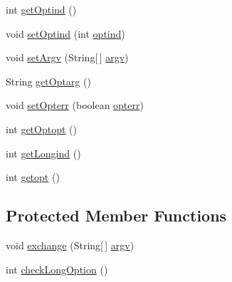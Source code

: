 \begin{DoxyCompactItemize}
int \hyperlink{classgnu_1_1getopt_1_1_getopt_af9f1a42a320e2112325fd5ea41504bdf}{getOptind} ()
\item 
void \hyperlink{classgnu_1_1getopt_1_1_getopt_a876a62ef42014ff4b18be4b132eb7ed8}{setOptind} (int \hyperlink{classgnu_1_1getopt_1_1_getopt_ae80c10d8bfc957fd93bec2f3619cbf18}{optind})
\item 
void \hyperlink{classgnu_1_1getopt_1_1_getopt_a9ac59fc870b6efdafee66014924cf12a}{setArgv} (String\mbox{[}$\,$\mbox{]} \hyperlink{classgnu_1_1getopt_1_1_getopt_adde2117f0df42f3254b37b05fd9833cf}{argv})
\item 
String \hyperlink{classgnu_1_1getopt_1_1_getopt_a306e1acd3be41f5e9462f42e78a6ca93}{getOptarg} ()
\item 
void \hyperlink{classgnu_1_1getopt_1_1_getopt_aa132089015be3665ca422f3eae3d0a38}{setOpterr} (boolean \hyperlink{classgnu_1_1getopt_1_1_getopt_a8712d370a08f90b7b49b0261a2df8581}{opterr})
\item 
int \hyperlink{classgnu_1_1getopt_1_1_getopt_ad33843ab06130ce60d60556241d1dc99}{getOptopt} ()
\item 
int \hyperlink{classgnu_1_1getopt_1_1_getopt_abaf4fb9de230e1950d93abc1b9f86a8d}{getLongind} ()
\item 
int \hyperlink{classgnu_1_1getopt_1_1_getopt_a49e6fc6e18756f5dfaf85c1067325c3b}{getopt} ()
\end{DoxyCompactItemize}
\subsection*{Protected Member Functions}
\begin{DoxyCompactItemize}
\item 
void \hyperlink{classgnu_1_1getopt_1_1_getopt_aaa3d697613ad3eacc714b9857dc52570}{exchange} (String\mbox{[}$\,$\mbox{]} \hyperlink{classgnu_1_1getopt_1_1_getopt_adde2117f0df42f3254b37b05fd9833cf}{argv})
\item 
int \hyperlink{classgnu_1_1getopt_1_1_getopt_ab748f7d3ed0781871d0b64f242e3674a}{checkLongOption} ()
\end{DoxyCompactItemize}
